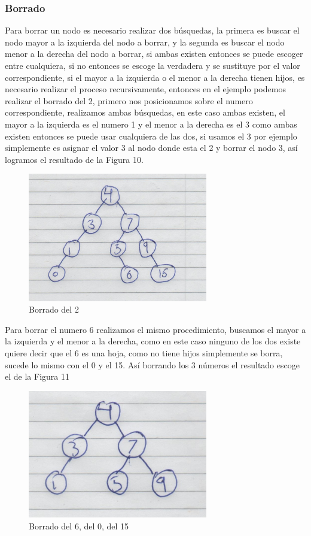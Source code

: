 \subsubsection{Borrado}
Para borrar un nodo es necesario realizar dos búsquedas, la primera es buscar el nodo mayor a la izquierda del nodo a borrar, y la segunda es buscar el nodo
menor a la derecha del nodo a borrar, si ambas existen entonces se puede escoger entre cualquiera, si no entonces se escoge la verdadera y se sustituye 
por el valor correspondiente, si el mayor a la izquierda o el menor a la derecha tienen hijos, es necesario realizar el proceso recursivamente, entonces en el 
ejemplo podemos realizar el borrado del 2, primero nos posicionamos sobre el numero correspondiente, realizamos ambas búsquedas, en este caso ambas existen,
el mayor a la izquierda es el numero 1 y el menor a la derecha es el 3 como ambas existen entonces se puede usar cualquiera de las dos,
si usamos el 3 por ejemplo simplemente es asignar el valor 3 al nodo donde esta el 2 y borrar el nodo 3, así logramos el resultado de la Figura 10.
\begin{figure}[H]
	\centering
	\includegraphics[width=0.7\textwidth]{./images/imagen10.jpg}
	\caption{Borrado del 2}
\end{figure} 
Para borrar el numero 6 realizamos el mismo procedimiento, buscamos el mayor a la izquierda y el menor a la derecha, como en este caso ninguno de los dos existe
quiere decir que el 6 es una hoja, como no tiene hijos simplemente se borra, sucede lo mismo con el 0 y el 15. Así borrando los 3 números el resultado escoge
el de la Figura 11
\begin{figure}[H]
	\centering
	\includegraphics[width=0.7\textwidth]{./images/imagen11.jpg}
	\caption{Borrado del 6, del 0, del 15}
\end{figure} 
